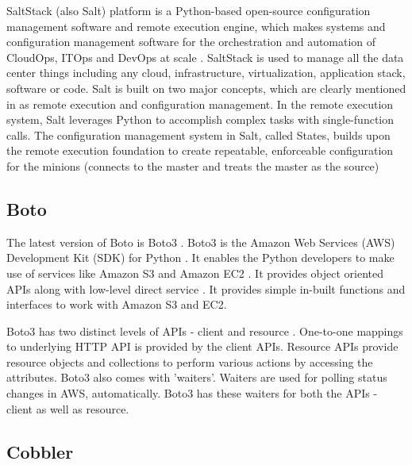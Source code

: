      SaltStack (also Salt) platform is a Python-based open-source
     configuration management software and remote execution engine,
     which makes systems and configuration management software for the
     orchestration and automation of CloudOps, ITOps and DevOps at
     scale \cite{www-saltstack}. SaltStack is used to manage all the
     data center things including any cloud, infrastructure,
     virtualization, application stack, software or code. Salt is
     built on two major concepts, which are clearly mentioned in
     \cite{SaltStack-book} as remote execution and configuration
     management. In the remote execution system, Salt leverages Python
     to accomplish complex tasks with single-function calls. The
     configuration management system in Salt, called States, builds
     upon the remote execution foundation to create repeatable,
     enforceable configuration for the minions (connects to the master
     and treats the master as the source)
     
\subsection{ Boto}

     The latest version of Boto is Boto3 \cite{www-boto}.
     Boto3 is the Amazon Web Services (AWS) Development Kit (SDK) for
     Python \cite{www-boto-github}. It enables the
     Python developers to make use of services like Amazon S3
     and Amazon EC2 \cite{www-boto-amazon-python-sdk}.  It provides
     object oriented APIs along with low-level direct service 
     \cite{www-boto3-documentation}.  It provides simple in-built functions 
     and interfaces to work with Amazon S3 and EC2.

     Boto3 has two distinct levels of APIs - client and resource 
     \cite{www-boto-amazon-python-sdk}. One-to-one mappings to underlying 
     HTTP API is provided by the client APIs. Resource APIs provide resource
     objects and collections to perform various actions by accessing
     the attributes.  Boto3 also comes with 'waiters'. Waiters are
     used for polling status changes in AWS, automatically. Boto3 has
     these waiters for both the APIs
     - client as well as resource. 
     
\subsection{ Cobbler}

